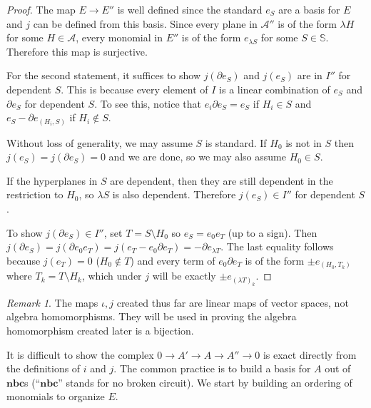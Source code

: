 \documentclass[article,twoside]{article}
\newcommand{\BB}[1]{\mathbb{#1}}
\newcommand{\script}[1]{\mathcal{#1}}
\newcommand{\tuples}{\BB{S}}
\newcommand{\NBC}{$\textbf{nbc}$}
\theoremstyle{plain}
\theoremstyle{plain}
\theoremstyle{plain}
\theoremstyle{plain}
\theoremstyle{plain}
\theoremstyle{definition}
\theoremstyle{definition}
\theoremstyle{definition}
\theoremstyle{remark}
\theoremstyle{remark}
\newtheorem{remark}[remark]{Remark}
\begin{document}
\begin{proof}
	The map $E\to E''$ is well defined since the standard $e_S$ are a basis for $E$ and $j$ can be defined from this basis. Since every plane in $\script{A}''$ is of the form $\lambda H$ for some $H\in \script{A}$, every monomial in $E''$ is of the form $e_{\lambda S}$ for some $S\in\tuples$. Therefore this map is surjective.
	
	For the second statement, it suffices to show $j(\partial e_S)$ and $j(e_S)$ are in $I''$ for dependent $S$. This is because every element of $I$ is a linear combination of $e_S$ and $\partial e_S$ for dependent $S$. To see this, notice that $e_i\partial e_S = e_S$ if $H_i\in S$ and $e_S - \partial e_{(H_i,S)}$ if $H_i\notin S$. 
	
	Without loss of generality, we may assume $S$ is standard. If $H_0$ is not in $S$ then $j(e_S)=j(\partial e_S)=0$ and we are done, so we may also assume $H_0\in S$.
	
	If the hyperplanes in $S$ are dependent, then they are still dependent in the restriction to $H_0$, so $\lambda S$ is also dependent. Therefore $j(e_S)\in I''$ for dependent $S$.
	
	To show $j(\partial e_S)\in I''$, set $T=S\setminus H_0$ so $e_S=e_0e_T$ (up to a sign). Then $j(\partial e_S) = j(\partial e_0e_T) = j(e_T-e_0\partial e_T) = -\partial e_{\lambda T}$. The last equality follows because $j(e_T)=0$ ($H_0\notin T$) and every term of $e_0\partial e_T$ is of the form $\pm e_{(H_0,T_k)}$ where $T_k=T\setminus H_k$, which under $j$ will be exactly $\pm e_{(\lambda T)_k}$.
\end{proof}


\begin{remark}\label{not_alg_maps}
	The maps $\iota,j$ created thus far are linear maps of vector spaces, not algebra homomorphisms. They will be used in proving the algebra homomorphism created later is a bijection.
\end{remark}






It is difficult to show the complex $0\to A'\to A\to A''\to 0$ is exact directly from the definitions of $i$ and $j$. The common practice is to build a basis for $A$ out of \NBC s (``\NBC'' stands for no broken circuit). We start by building an ordering of monomials to organize $E$.
\end{document}
